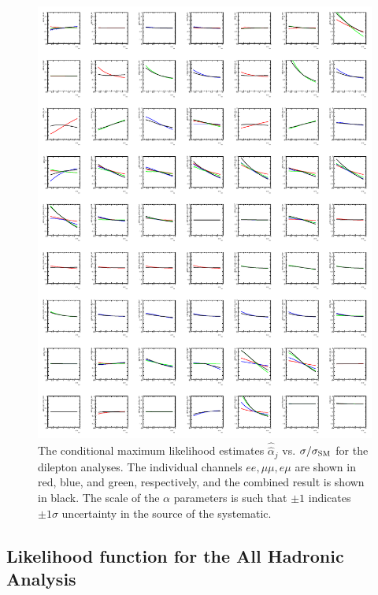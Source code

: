  \begin{figure}[htbp]
   \begin{center}
     \includegraphics[width=\textwidth]{figures/comb/DilepProfilePlots}
    \caption{The conditional maximum likelihood estimates $\hat{\hat{\alpha}}_j$ vs. $\sigma/\sigma_{\rm SM}$ for the dilepton analyses.  The individual channels $ee, \mu\mu, e\mu$ are shown in red, blue, and green, respectively, and the combined result is shown in black.  The scale of the $\alpha$ parameters is such that $\pm 1$ indicates $\pm 1\sigma$ uncertainty in the source of the systematic.}
     \label{fig:dilepton_profile}
   \end{center}
 \end{figure}



\subsection{Likelihood function for the All Hadronic Analysis}
\label{sec:allhad}

